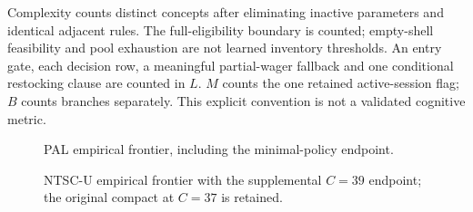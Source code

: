 \documentclass[11pt]{article}
\theoremstyle{definition}\newtheorem{definition}[theorem]{Definition}
\begin{document}
Complexity counts distinct concepts after eliminating inactive parameters and identical adjacent rules. The full-eligibility boundary is counted; empty-shell feasibility and pool exhaustion are not learned inventory thresholds. An entry gate, each decision row, a meaningful partial-wager fallback and one conditional restocking clause are counted in $L$. $M$ counts the one retained active-session flag; $B$ counts branches separately. This explicit convention is not a validated cognitive metric.
\begin{figure}[H]\centering{}\caption{PAL empirical frontier, including the minimal-policy endpoint.}\label{fig:frontier-1}\end{figure}
\begin{figure}[H]\centering{}\caption{NTSC-U empirical frontier with the supplemental $C=39$ endpoint; the original compact at $C=37$ is retained.}\label{fig:frontier-2}\end{figure}
\end{document}
